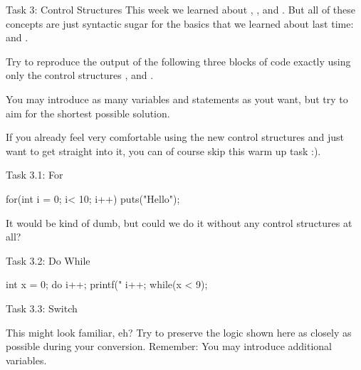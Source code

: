 \documentclass[10pt,graphics,aspectratio=169,table]{beamer}
\begin{document}
\begin{frame}[fragile]{Task 3: Control Structures}
This week we learned about , , and .
But all of these concepts are just syntactic sugar for the basics that 
we learned about last time:  and .

Try to reproduce the output of the following three blocks of code exactly 
using only the control structures ,  and .

You may introduce as many variables and statements as yout want, 
but try to aim for the shortest possible solution. 

If you already feel very comfortable using the new control structures 
and just want to get straight into it, you can of course skip 
this warm up task :).
\end{frame}

\begin{frame}[fragile]{Task 3.1: For}
\begin{codeblock}
for(int i = 0; i< 10; i++){
    puts("Hello");
}
\end{codeblock}

It would be kind of dumb, but could we do it without
any control structures at all?

\end{frame}
\begin{frame}[fragile]{Task 3.2: Do While}
\begin{codeblock}
int x = 0;
do{
    i++;
    printf("%
    i++;
}while(x < 9);
\end{codeblock}

\end{frame}
\begin{frame}[fragile]{Task 3.3: Switch}

This might look familiar, eh? Try to preserve the logic shown here 
as closely as possible during your conversion. 
Remember: You may introduce additional variables.
\end{frame}
\end{document}

